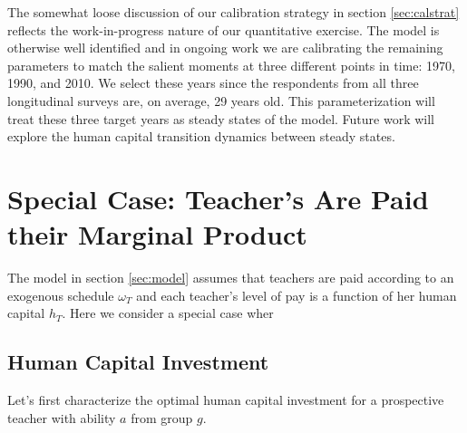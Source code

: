 \documentclass[onehalfspacing,11pt]{article}
\begin{document}
The somewhat loose discussion of our calibration strategy in section \ref{sec:calstrat} reflects the work-in-progress nature of our quantitative exercise. The model is otherwise well identified and in ongoing work we are calibrating the remaining parameters to match the salient moments at three different points in time: 1970, 1990, and 2010. We select these years since the respondents from all three longitudinal surveys are, on average, 29 years old. This parameterization will treat these three target years as steady states of the model. Future work will explore the human capital transition dynamics between steady states.


\newpage




\appendix
\section{Special Case: Teacher's Are Paid their Marginal Product}\label{app:equilibrium}
The model in section \ref{sec:model} assumes that teachers are paid according to an exogenous schedule $\omega_T$ and each teacher's level of pay is a function of her human capital $h_T$. Here we consider a special case wher
\subsection{Human Capital Investment}
Let's first characterize the optimal human capital investment for a prospective teacher with ability $a$ from group $g$.%
\end{document}
